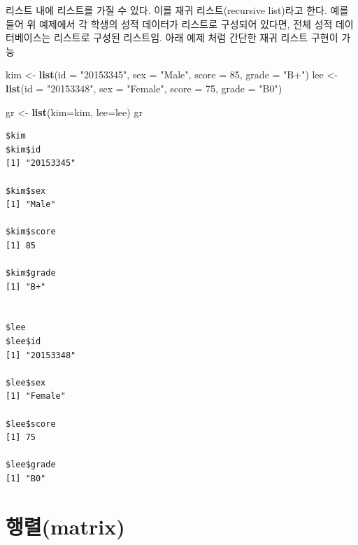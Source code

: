 \documentclass[
  11pt,
]{krantz}
\makeatletter
\newenvironment{Shaded}{\begin{snugshade}}{\end{snugshade}}
\newcommand{\DataTypeTok}[1]{\textcolor[rgb]{0.27,0.27,0.27}{#1}}
\newcommand{\DecValTok}[1]{\textcolor[rgb]{0.06,0.06,0.06}{#1}}
\newcommand{\KeywordTok}[1]{\textcolor[rgb]{0.27,0.27,0.27}{\textbf{#1}}}
\newcommand{\NormalTok}[1]{#1}
\newcommand{\StringTok}[1]{\textcolor[rgb]{0.5,0.5,0.5}{#1}}
\newenvironment{kframe}{%
\medskip{}
\setlength{\fboxsep}{.8em}
 \def\at@end@of@kframe{}%
 \ifinner\ifhmode%
  \def\at@end@of@kframe{\end{minipage}}%
  \begin{minipage}{\columnwidth}%
 \fi\fi%
 \def\FrameCommand##1{\hskip\@totalleftmargin \hskip-\fboxsep
 \colorbox{shadecolor}{##1}\hskip-\fboxsep
     \hskip-\linewidth \hskip-\@totalleftmargin \hskip\columnwidth}%
 \MakeFramed {\advance\hsize-\width
   \@totalleftmargin\z@ \linewidth\hsize
   \@setminipage}}%
 {\par\unskip\endMakeFramed%
 \at@end@of@kframe}
\newenvironment{rmdblock}[1]
  {
  \begin{itemize}
  \renewcommand{\labelitemi}{
    \raisebox{-.7\height}[0pt][0pt]{
      {\setkeys{Gin}{width=3em,keepaspectratio}\texttt{[image: images/\#1]}}
    }
  }
  \setlength{\fboxsep}{1em}
  \begin{kframe}
  \item
  }
  {
  \end{kframe}
  \end{itemize}
  }
\newenvironment{rmdnote}
  {\begin{rmdblock}{note}}
  {\end{rmdblock}}
\makeatother
\begin{document}
\normalsize

\footnotesize

\begin{rmdnote}
\begin{rmdnote}

리스트 내에 리스트를 가질 수 있다. 이를 재귀 리스트(recursive list)라고 한다. 예를 들어 위 예제에서 각 학생의 성적 데이터가 리스트로 구성되어 있다면, 전체 성적 데이터베이스는 리스트로 구성된 리스트임. 아래 예제 처럼 간단한 재귀 리스트 구현이 가능

\end{rmdnote}
\end{rmdnote}

\normalsize

\footnotesize

\begin{Shaded}
\begin{Highlighting}[]
\NormalTok{kim <-}\StringTok{ }\KeywordTok{list}\NormalTok{(}\DataTypeTok{id =} \StringTok{"20153345"}\NormalTok{, }\DataTypeTok{sex =} \StringTok{"Male"}\NormalTok{, }\DataTypeTok{score =} \DecValTok{85}\NormalTok{, }\DataTypeTok{grade =} \StringTok{"B+"}\NormalTok{)}
\NormalTok{lee <-}\StringTok{ }\KeywordTok{list}\NormalTok{(}\DataTypeTok{id =} \StringTok{"20153348"}\NormalTok{, }\DataTypeTok{sex =} \StringTok{"Female"}\NormalTok{, }\DataTypeTok{score =} \DecValTok{75}\NormalTok{, }\DataTypeTok{grade =} \StringTok{"B0"}\NormalTok{)}

\NormalTok{gr <-}\StringTok{ }\KeywordTok{list}\NormalTok{(}\DataTypeTok{kim=}\NormalTok{kim, }\DataTypeTok{lee=}\NormalTok{lee)}
\NormalTok{gr}
\end{Highlighting}
\end{Shaded}

\begin{verbatim}
$kim
$kim$id
[1] "20153345"

$kim$sex
[1] "Male"

$kim$score
[1] 85

$kim$grade
[1] "B+"


$lee
$lee$id
[1] "20153348"

$lee$sex
[1] "Female"

$lee$score
[1] 75

$lee$grade
[1] "B0"
\end{verbatim}

\normalsize

\hypertarget{matrix}{%
\section{행렬(matrix)}\label{matrix}}
\end{document}
